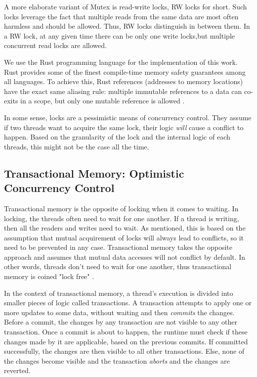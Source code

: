 A more elaborate variant of Mutex is read-write locks, RW locks for short. Such locks leverage the
fact that multiple reads from the same data are most often harmless and should be allowed. Thus, RW
locks distinguish in between them. In a RW lock, at any given time there can be only one write
locks,but multiple concurrent read locks are allowed.

\begin{remark}
	We use the Rust programming language for the implementation of this work. Rust provides some of
	the finest compile-time memory safety guarantees among all languages. To achieve this, Rust
	references (addresses to memory locations) have the exact same aliasing rule: multiple immutable
	references to a data can co-exits in a scope, but only one mutable reference is allowed
	\cite{weissOxideEssenceRust2020}.
\end{remark}

In some sense, locks are a pessimistic means of concurrency control. They assume if two threads want
to acquire the same lock, their logic \textit{will} cause a conflict to happen. Based on the
granularity of the lock and the internal logic of each threads, this might not be the case all the
time.

\subsection{Transactional Memory: Optimistic Concurrency Control} \label{chap_bg:subsec:stm}

Transactional memory is the opposite of locking when it comes to waiting. In locking, the
threads often need to wait for one another. If a thread is writing, then all the readers and writes
need to wait. As mentioned, this is based on the assumption that mutual acquirement of locks will
always lead to conflicts, so it need to be prevented in any case. Transactional memory takes the
opposite approach and assumes that mutual data accesses will not conflict by default. In other
words, threads don't need to wait for one another, thus transactional memory is coined "lock free"
\cite{knightArchitectureMostlyFunctional1986}.


In the context of transactional memory, a thread's execution is divided into smaller pieces of logic
called transactions. A transaction attempts to apply one or more updates to some data, without
waiting and then \textit{commits} the changes. Before a commit, the changes by any transaction are
not visible to any other transaction. Once a commit is about to happen, the runtime must check if
these changes made by it are applicable, based on the previous commits. If committed successfully,
the changes are then visible to all other transactions. Else, none of the changes become visible and
the transaction \textit{aborts} and the changes are reverted.

